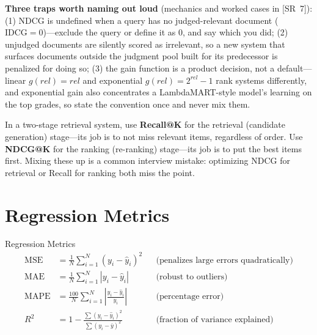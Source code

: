 \textbf{Three traps worth naming out loud} (mechanics and worked cases in [SR~7]): (1) NDCG is undefined when a query has no judged-relevant document ($\text{IDCG} = 0$)---exclude the query or define it as 0, and say which you did; (2) unjudged documents are silently scored as irrelevant, so a new system that surfaces documents outside the judgment pool built for its predecessor is penalized for doing so; (3) the gain function is a product decision, not a default---linear $g(rel) = rel$ and exponential $g(rel) = 2^{rel} - 1$ rank systems differently, and exponential gain also concentrates a LambdaMART-style model's learning on the top grades, so state the convention once and never mix them.

\begin{keyinsight}
In a two-stage retrieval system, use \textbf{Recall@K} for the retrieval (candidate generation) stage---its job is to not miss relevant items, regardless of order. Use \textbf{NDCG@K} for the ranking (re-ranking) stage---its job is to put the best items first. Mixing these up is a common interview mistake: optimizing NDCG for retrieval or Recall for ranking both miss the point.
\end{keyinsight}

\section{Regression Metrics}
\label{sec:regression_metrics}

\begin{mathresult}{Regression Metrics}
\begin{align}
\text{MSE} &= \frac{1}{N}\sum_{i=1}^{N}(y_i - \hat{y}_i)^2 & &\text{(penalizes large errors quadratically)} \\[4pt]
\text{MAE} &= \frac{1}{N}\sum_{i=1}^{N}|y_i - \hat{y}_i| & &\text{(robust to outliers)} \\[4pt]
\text{MAPE} &= \frac{100}{N}\sum_{i=1}^{N}\left|\frac{y_i - \hat{y}_i}{y_i}\right| & &\text{(percentage error)} \\[4pt]
R^2 &= 1 - \frac{\sum(y_i - \hat{y}_i)^2}{\sum(y_i - \bar{y})^2} & &\text{(fraction of variance explained)}
\end{align}
\end{mathresult}


